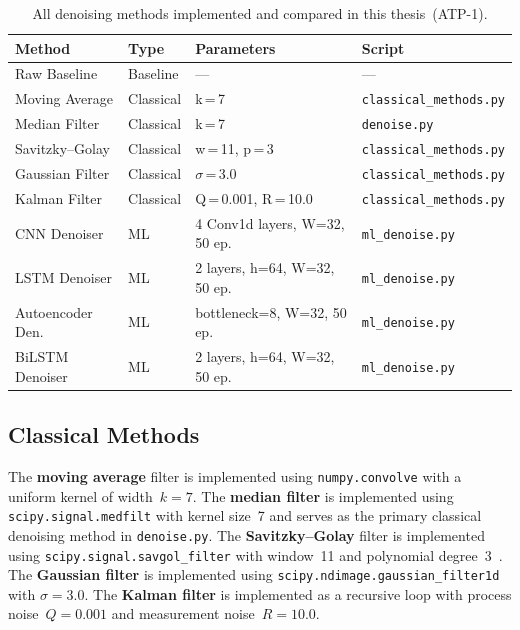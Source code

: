 \begin{table}[H]
\centering
\caption{All denoising methods implemented and compared in this thesis~(ATP-1).}
\label{tab:denoise_methods}
\begin{tabular}{llll}
\toprule
\textbf{Method} & \textbf{Type} & \textbf{Parameters} & \textbf{Script} \\
\midrule
Raw Baseline       & Baseline  & ---                              & --- \\
Moving Average     & Classical & k\,=\,7                          & \texttt{classical\_methods.py} \\
Median Filter      & Classical & k\,=\,7                          & \texttt{denoise.py} \\
Savitzky--Golay    & Classical & w\,=\,11, p\,=\,3                & \texttt{classical\_methods.py} \\
Gaussian Filter    & Classical & $\sigma$\,=\,3.0                 & \texttt{classical\_methods.py} \\
Kalman Filter      & Classical & Q\,=\,0.001, R\,=\,10.0         & \texttt{classical\_methods.py} \\
CNN Denoiser       & ML        & 4 Conv1d layers, W=32, 50 ep.   & \texttt{ml\_denoise.py} \\
LSTM Denoiser      & ML        & 2 layers, h=64, W=32, 50 ep.    & \texttt{ml\_denoise.py} \\
Autoencoder Den.   & ML        & bottleneck=8, W=32, 50 ep.      & \texttt{ml\_denoise.py} \\
BiLSTM Denoiser    & ML        & 2 layers, h=64, W=32, 50 ep.    & \texttt{ml\_denoise.py} \\
\bottomrule
\end{tabular}
\end{table}

\subsection{Classical Methods}

The \textbf{moving average} filter is implemented using \texttt{numpy.convolve} with a uniform kernel of width~$k=7$. The \textbf{median filter} is implemented using \texttt{scipy.signal.medfilt} with kernel size~7 and serves as the primary classical denoising method in \texttt{denoise.py}. The \textbf{Savitzky--Golay} filter is implemented using \texttt{scipy.signal.savgol\_filter} with window~11 and polynomial degree~3~\cite{savitzky1964smoothing}. The \textbf{Gaussian filter} is implemented using \texttt{scipy.ndimage.gaussian\_filter1d} with $\sigma=3.0$. The \textbf{Kalman filter} is implemented as a recursive loop with process noise~$Q=0.001$ and measurement noise~$R=10.0$.

